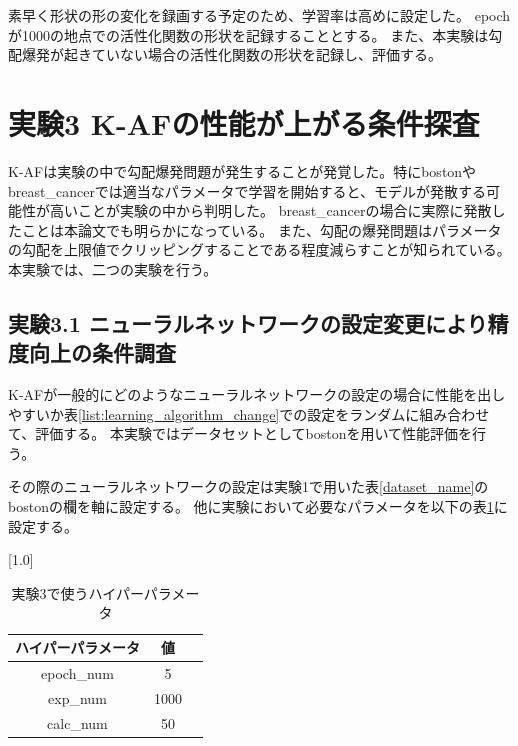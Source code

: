 素早く形状の形の変化を録画する予定のため、学習率は高めに設定した。
epochが1000の地点での活性化関数の形状を記録することとする。
また、本実験は勾配爆発が起きていない場合の活性化関数の形状を記録し、評価する。



\section{実験3 K-AFの性能が上がる条件探査}
\label{exp3}
K-AFは実験の中で勾配爆発問題が発生することが発覚した。特にbostonやbreast\_cancerでは適当なパラメータで学習を開始すると、モデルが発散する可能性が高いことが実験の中から判明した。
breast\_cancerの場合に実際に発散したことは本論文でも明らかになっている。
また、勾配の爆発問題はパラメータの勾配を上限値でクリッピングすることである程度減らすことが知られている。
本実験では、二つの実験を行う。

\subsection{実験3.1 ニューラルネットワークの設定変更により精度向上の条件調査}
\label{exp3.1}
K-AFが一般的にどのようなニューラルネットワークの設定の場合に性能を出しやすいか表\ref{list:learning_algorithm_change}での設定をランダムに組み合わせて、評価する。
本実験ではデータセットとしてbostonを用いて性能評価を行う。


その際のニューラルネットワークの設定は実験1で用いた表\ref{dataset_name}のbostonの欄を軸に設定する。
他に実験において必要なパラメータを以下の表\ref{exp31hyper}に設定する。


\begin{table}[hbtp]
    \begin{center}
        \caption{実験3で使うハイパーパラメータ}
        \label{exp31hyper}
        \vspace{2mm} 
        \scalebox{1.0}[1.0]{
            \begin{tabular}{||c|c|c||}
            \hline
            ハイパーパラメータ  & 値 \\
            \hline
            epoch\_num & 5  \\
            \hline
            exp\_num & 1000 \\
            \hline
            calc\_num & 50  \\
            \hline
            \end{tabular}
        }
    \end{center}
\end{table}

